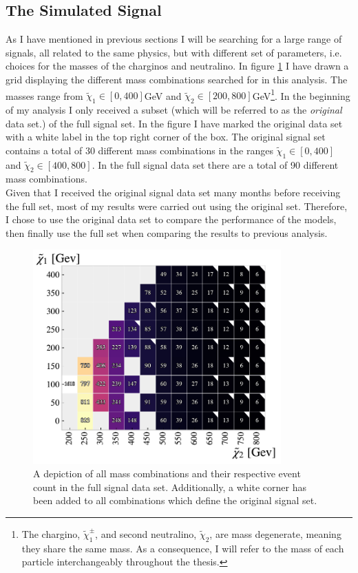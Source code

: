 \subsection{The Simulated Signal}\label{subsec:signal}
As I have mentioned in previous sections I will be searching for a large range of signals, all related to the same
physics, but with different set of parameters, i.e. choices for the masses of the charginos and neutralino. In figure \ref{fig:nrSignal} I have drawn a 
grid displaying the different mass combinations searched for in this analysis. The masses range from ${\tilde{\chi}_1}\in[0,400]$GeV
and ${\tilde{\chi}_2}\in[200,800]$GeV\footnote{The chargino, $\tilde{\chi}^{\pm}_1$, and second neutralino, $\tilde{\chi}_2$, are mass degenerate, 
meaning they share the same mass. As a consequence, I will refer to the mass of each particle interchangeably throughout the thesis.}. In the beginning 
of my analysis I only received a subset (which will be referred to as the \emph{original} data set.) of the full signal set. In the figure I have marked the original data set with a white label in the top 
right corner of the box. The original signal set contains a total of 30 different mass combinations in the ranges 
${\tilde{\chi}_1}\in[0,400]$ and ${\tilde{\chi}_2}\in[400,800]$. In the full signal data set there are a total of 90 different 
mass combinations.
\\
Given that I received the original signal data set many months before receiving the full set, most of my results were carried out using the 
original set. Therefore, I chose to use the original data set to compare the performance of the models, then finally use the full set 
when comparing the results to previous analysis.
\begin{figure}
  \centering
  \includegraphics[width=0.85\textwidth]{Figures/MLResults/NN/SUSY/Grid/NrSignalEvents.pdf}
  \caption{A depiction of all mass combinations and their respective event count in the full signal data set.
  Additionally, a white corner has been added to all combinations which define the original signal set.}
  \label{fig:nrSignal}
\end{figure}
